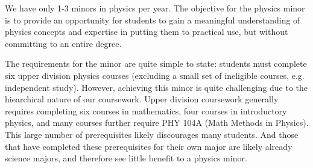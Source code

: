 \documentclass[12pt]{article}
\begin{document}



We have only 1-3 minors in physics per year.  The objective for the
physics minor is to provide an opportunity for students to gain a
meaningful understanding of physics concepts and expertise in putting
them to practical use, but without committing to an entire degree.

The requirements for the minor are quite simple to state: students
must complete six upper division physics courses (excluding a small
set of ineligible courses, e.g. independent study).  However,
achieving this minor is quite challenging due to the hiearchical
nature of our coursework.  Upper division coursework generally
requires completing six courses in mathematics, four courses in
introductory physics, and many courses further require PHY 104A (Math
Methods in Physics).  This large number of prerequisites likely
discourages many students.  And those that have completed these
prerequisites for their own major are likely already science majors,
and therefore see little benefit to a physics minor.
\end{document}
